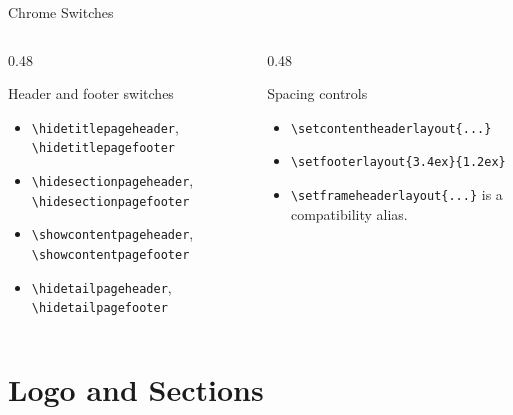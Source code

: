 \documentclass[aspectratio=169,10pt]{beamer}
\begin{document}
\begin{academicframe}{Chrome Switches}
  \begin{columns}[T,onlytextwidth]
    \begin{column}{0.48\textwidth}
      \begin{block}{Header and footer switches}
        \scriptsize
        \begin{itemize}
          \item \texttt{\textbackslash hidetitlepageheader},
            \texttt{\textbackslash hidetitlepagefooter}
          \item \texttt{\textbackslash hidesectionpageheader},
            \texttt{\textbackslash hidesectionpagefooter}
          \item \texttt{\textbackslash showcontentpageheader},
            \texttt{\textbackslash showcontentpagefooter}
          \item \texttt{\textbackslash hidetailpageheader},
            \texttt{\textbackslash hidetailpagefooter}
        \end{itemize}
      \end{block}
    \end{column}
    \begin{column}{0.48\textwidth}
      \begin{exampleblock}{Spacing controls}
        \scriptsize
        \begin{itemize}
          \item \texttt{\textbackslash setcontentheaderlayout\{...\}}
          \item \texttt{\textbackslash setfooterlayout\{3.4ex\}\{1.2ex\}}
          \item \texttt{\textbackslash setframeheaderlayout\{...\}} is a compatibility alias.
        \end{itemize}
      \end{exampleblock}
    \end{column}
  \end{columns}
\end{academicframe}

\section{Logo and Sections}
\end{document}
